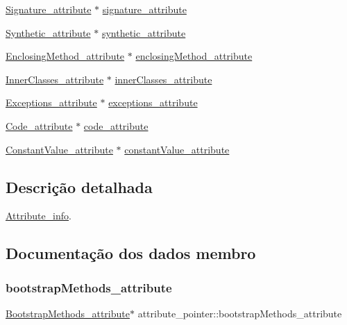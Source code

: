 \begin{DoxyCompactItemize}
\hyperlink{struct_signature__attribute}{Signature\+\_\+attribute} $\ast$ \hyperlink{unionattribute__pointer_a2b70c1eb93cfc0cf9ad2070fe4ba3441}{signature\+\_\+attribute}
\item 
\hyperlink{struct_synthetic__attribute}{Synthetic\+\_\+attribute} $\ast$ \hyperlink{unionattribute__pointer_a401c47044c8871e4c8f5a6db9d8d8139}{synthetic\+\_\+attribute}
\item 
\hyperlink{struct_enclosing_method__attribute}{Enclosing\+Method\+\_\+attribute} $\ast$ \hyperlink{unionattribute__pointer_a2c54b10a006bbd4ed3ae83dbb1cdf8e9}{enclosing\+Method\+\_\+attribute}
\item 
\hyperlink{struct_inner_classes__attribute}{Inner\+Classes\+\_\+attribute} $\ast$ \hyperlink{unionattribute__pointer_a053d5fd49a841c9710aacb6541b01976}{inner\+Classes\+\_\+attribute}
\item 
\hyperlink{struct_exceptions__attribute}{Exceptions\+\_\+attribute} $\ast$ \hyperlink{unionattribute__pointer_a1d45eae92b5683e363e39016bd04d528}{exceptions\+\_\+attribute}
\item 
\hyperlink{struct_code__attribute}{Code\+\_\+attribute} $\ast$ \hyperlink{unionattribute__pointer_a620a646b296f0e4a073154c4fa366fbb}{code\+\_\+attribute}
\item 
\hyperlink{struct_constant_value__attribute}{Constant\+Value\+\_\+attribute} $\ast$ \hyperlink{unionattribute__pointer_a8663de3142bac31a864348e70dfbf0d6}{constant\+Value\+\_\+attribute}
\end{DoxyCompactItemize}


\subsection{Descrição detalhada}
\hyperlink{struct_attribute__info}{Attribute\+\_\+info}. 

\subsection{Documentação dos dados membro}
\mbox{\label{unionattribute__pointer_a8c5dd68e9d26cf4693af6d45ca90e1bf}} 
\subsubsection{\texorpdfstring{bootstrap\+Methods\+\_\+attribute}{bootstrapMethods\_attribute}}
{\footnotesize\ttfamily \hyperlink{struct_bootstrap_methods__attribute}{Bootstrap\+Methods\+\_\+attribute}$\ast$ attribute\+\_\+pointer\+::bootstrap\+Methods\+\_\+attribute}

